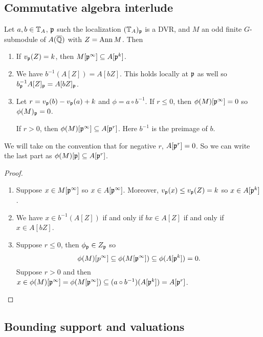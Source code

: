 \documentclass{article}
\begin{document}
\subsection{Commutative algebra interlude}%
\label{sub:commutative_algebra_interlude}

\begin{lemma}\label{lem:com_alg}
    Let $a,b\in \mathbb{T}_A$, $\mathfrak{p}$ such the localization $(\mathbb{T}_A)_{\mathfrak{p}}$ is a DVR, and
    $M$ an odd finite $G$-submodule of $A(\overline{\mathbb{Q}})$ with $Z=\operatorname{Ann} M$. Then
    \begin{enumerate}
        \item 
            If $v_{\mathfrak{p}}(Z) = k$, then $M[\mathfrak{p}^\infty]\subseteq A[\mathfrak{p}^k]$.
        \item
            We have $b^{-1}(A[Z])=A[bZ]$. This holds locally at $\mathfrak{p}$ as well so
            $b_{\mathfrak{p}} ^{-1} A[Z]_{\mathfrak{p}} = A[bZ]_{\mathfrak{p}}$.
        \item
            Let $r=v_{\mathfrak{p}}(b)-v_{\mathfrak{p}}(a)+k$ and $\phi=a\circ b^{-1}$. If $r\leq
            0$, then $\phi(M)[\mathfrak{p}^\infty]=0$ so $\phi(M)_{\mathfrak{p}}=0$.
            
            If $r>0$, then
            $\phi(M)[\mathfrak{p}^\infty]\subseteq A[\mathfrak{p}^r]$. Here $b^{-1}$ is the
            preimage of $b$.
    \end{enumerate}
    We will take on the convention that for negative $r$, $A[\mathfrak{p}^r]=0$. So we can
    write the last part as $\phi(M)[\mathfrak{p}]\subseteq A[\mathfrak{p}^r]$.
\end{lemma}
\begin{proof}
    \mbox{}
    \begin{enumerate}
        \item 
            Suppose $x\in M[\mathfrak{p}^\infty]$ so $x\in A[\mathfrak{p}^\infty]$. Moreover,
            $v_{\mathfrak{p}}(x) \leq v_{\mathfrak{p}}(Z) = k$ so $x\in A[\mathfrak{p}^k]$.
        \item
            We have $x\in b^{-1}(A[Z])$ if and only if $bx \in A[Z]$ if and
            only if $x\in A[bZ]$.
        \item
            Suppose $r\leq 0$, then $\phi_{\mathfrak{p}} \in Z_{\mathfrak{p}}$ so
            \[
                \phi(M)[p^\infty]\subseteq \phi(M[\mathfrak{p}^\infty])
                \subseteq \phi(A[\mathfrak{p}^k]) = 0.
            \]
            Suppose $r>0$ and then $x\in \phi(M)[\mathfrak{p}^\infty] =
            \phi(M[\mathfrak{p}^\infty])\subseteq (a\circ
            b^{-1})(A[\mathfrak{p}^k])=A[\mathfrak{p}^r]$.
    \end{enumerate}
\end{proof}

\subsection{Bounding support and valuations}%
\label{sub:bounding_support_and_valuations} 
\end{document}
